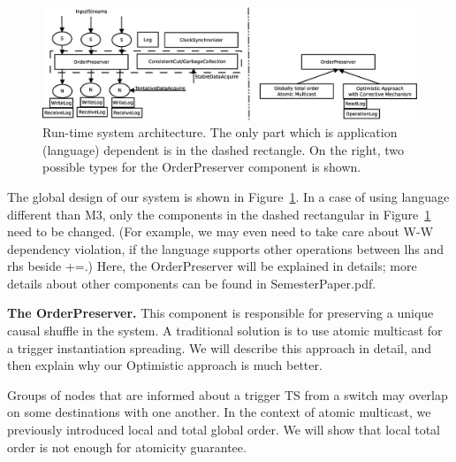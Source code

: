 \documentclass{sig-semester}
\begin{document}
\begin{figure}
\centering
\includegraphics[width=7in]{dynamicArchitecture.eps}
\vspace{-3mm}
\caption{Run-time system architecture. The only part which is application (language) dependent is in the dashed rectangle. On the right, two possible types for the OrderPreserver component is shown.}
\label{fig:dynamicArchitecture}
\vspace{-2mm}
\end{figure}
The global design of our system is shown in Figure~\ref{fig:dynamicArchitecture}. In a case of using language different than M3, only the components in the dashed rectangular in Figure~\ref{fig:dynamicArchitecture} need to be changed. (For example, we may even need to take care about W-W dependency violation, if the language supports other operations between lhs and rhs beside +=.) Here, the OrderPreserver will be explained in details; more details about other components can be found in SemesterPaper.pdf.

\textbf{The OrderPreserver.} This component is responsible for preserving a unique causal shuffle in the system. A traditional solution is to use atomic multicast for a trigger instantiation spreading. We will describe this approach in detail, and then explain why our Optimistic approach is much better.

Groups of nodes that are informed about a trigger TS from a switch may overlap on some destinations with one another. In the context of atomic multicast, we previously introduced local and total global order. We will show that local total order is not enough for atomicity guarantee.
\end{document}
